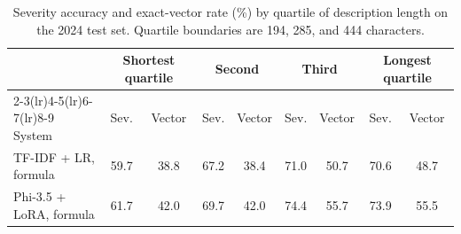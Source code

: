 \begin{table}[t]
\centering
\caption{Severity accuracy and exact-vector rate (\%) by quartile of description length on the 2024 test set. Quartile boundaries are 194, 285, and 444 characters.}
\label{tab:length}
\small
\setlength{\tabcolsep}{4pt}
\begin{tabular}{lcccccccc}
\toprule
 & \multicolumn{2}{c}{Shortest quartile} & \multicolumn{2}{c}{Second} & \multicolumn{2}{c}{Third} & \multicolumn{2}{c}{Longest quartile} \\
\cmidrule(lr){2-3}\cmidrule(lr){4-5}\cmidrule(lr){6-7}\cmidrule(lr){8-9}
System & Sev. & Vector & Sev. & Vector & Sev. & Vector & Sev. & Vector \\
\midrule
TF-IDF + LR, formula & 59.7 & 38.8 & 67.2 & 38.4 & 71.0 & 50.7 & 70.6 & 48.7 \\
Phi-3.5 + LoRA, formula & 61.7 & 42.0 & 69.7 & 42.0 & 74.4 & 55.7 & 73.9 & 55.5 \\
\bottomrule
\end{tabular}
\end{table}
